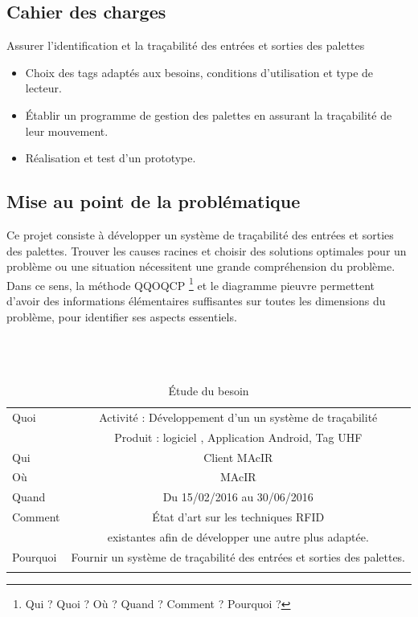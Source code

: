 \documentclass[11pt, a4paper, twoside]{book}
\begin{document}
\subsection{Cahier des charges}
Assurer l’identification et la traçabilité des entrées et sorties des palettes
\begin{itemize}
\item Choix des tags adaptés aux besoins, conditions d’utilisation et type de lecteur.
\item Établir un programme de gestion des palettes en assurant la traçabilité de leur mouvement.
\item Réalisation et test d’un prototype.\\
\end{itemize}
\subsection{Mise au point de la problématique}
Ce projet consiste à développer un système de traçabilité des entrées et sorties des palettes. Trouver les causes racines et choisir des solutions optimales pour un problème ou une situation nécessitent une grande compréhension du problème. Dans ce sens, la méthode QQOQCP \footnote{Qui ? Quoi ? Où ? Quand ? Comment ?  Pourquoi ?} et le diagramme pieuvre permettent d'avoir des informations élémentaires suffisantes sur toutes les dimensions du problème, pour identifier ses aspects essentiels.\\\\\\\
        
\begin{longtable}{|l|c|}
  \hline
  Quoi & Activité : Développement d’un un système de traçabilité \\
       &  Produit : logiciel , Application Android, Tag UHF \\
  \hline
  Qui & Client MAcIR\\
  \hline
  Où & MAcIR\\
  \hline
  Quand & Du 15/02/2016 au 30/06/2016\\
  \hline
  Comment & État d’art sur les techniques RFID \\
          &  existantes afin de développer une autre plus adaptée.\\
  \hline
  Pourquoi & Fournir un système de traçabilité des entrées et sorties des palettes.\\
  \hline
  
\caption{Étude du besoin}
\end{longtable}
\end{document}

